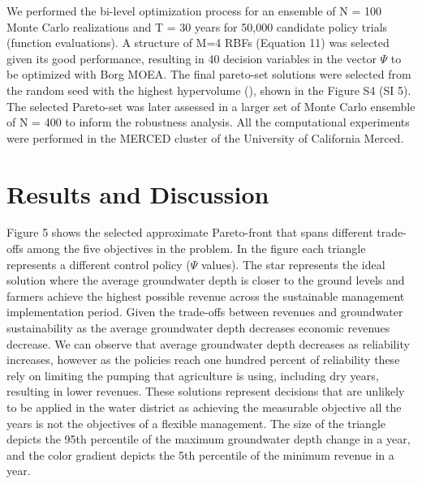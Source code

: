 \documentclass[11pt,a4paper]{article}
\begin{document}
We performed the bi-level optimization process for an ensemble of N = 100 Monte Carlo realizations and T = 30 years for 50,000 candidate policy trials (function evaluations). A structure of M=4 RBFs (Equation 11) was selected given its good performance, resulting in 40 decision variables in the vector $\Psi$ to be optimized with Borg MOEA. The final pareto-set solutions were selected from the random seed with the highest hypervolume (\cite{hadka_large-scale_2015}), shown in the Figure S4 (SI 5). The selected Pareto-set was later assessed in a larger set of Monte Carlo ensemble of N = 400 to inform the robustness analysis. All the computational experiments were performed in the MERCED cluster of the University of California Merced. 


\section{Results and Discussion}

Figure 5 shows the selected approximate Pareto-front that spans different trade-offs among the five objectives in the problem. In the figure each triangle represents a different control policy ($\Psi$ values). The star represents the ideal solution where the average groundwater depth is closer to the ground levels and farmers achieve the highest possible revenue across the sustainable management implementation period. Given the trade-offs between revenues and groundwater sustainability as the average groundwater depth decreases economic revenues decrease. We can observe that average groundwater depth decreases as reliability increases, however as the policies reach one hundred percent of reliability these rely on limiting the pumping that agriculture is using, including dry years, resulting in lower revenues. These solutions represent decisions that are unlikely to be applied in the water district as achieving the measurable objective all the years is not the objectives of a flexible management. The size of the triangle depicts the 95th percentile of the maximum groundwater depth change in a year, and the color gradient depicts the 5th percentile of the minimum revenue in a year. 
\end{document}
